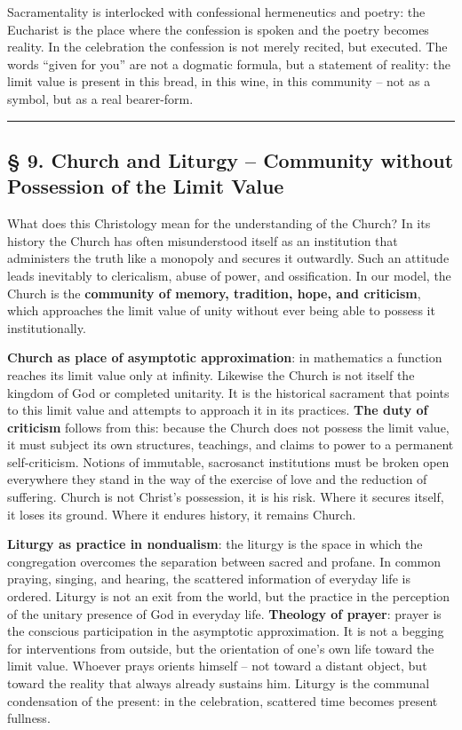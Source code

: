 \documentclass[
  english,
]{article}
\begin{document}
Sacramentality is interlocked with confessional hermeneutics and poetry:
the Eucharist is the place where the confession is spoken and the poetry
becomes reality. In the celebration the confession is not merely
recited, but executed. The words ``given for you'' are not a dogmatic
formula, but a statement of reality: the limit value is present in this
bread, in this wine, in this community -- not as a symbol, but as a real
bearer-form.

\begin{center}\rule{0.5\linewidth}{0.5pt}\end{center}

\subsection{§ 9. Church and Liturgy -- Community without Possession of
the Limit
Value}\label{church-and-liturgy-community-without-possession-of-the-limit-value}

What does this Christology mean for the understanding of the Church? In
its history the Church has often misunderstood itself as an institution
that administers the truth like a monopoly and secures it outwardly.
Such an attitude leads inevitably to clericalism, abuse of power, and
ossification. In our model, the Church is the \textbf{community of
memory, tradition, hope, and criticism}, which approaches the limit
value of unity without ever being able to possess it institutionally.

\textbf{Church as place of asymptotic approximation}: in mathematics a
function reaches its limit value only at infinity. Likewise the Church
is not itself the kingdom of God or completed unitarity. It is the
historical sacrament that points to this limit value and attempts to
approach it in its practices. \textbf{The duty of criticism} follows
from this: because the Church does not possess the limit value, it must
subject its own structures, teachings, and claims to power to a
permanent self-criticism. Notions of immutable, sacrosanct institutions
must be broken open everywhere they stand in the way of the exercise of
love and the reduction of suffering. Church is not Christ's possession,
it is his risk. Where it secures itself, it loses its ground. Where it
endures history, it remains Church.

\textbf{Liturgy as practice in nondualism}: the liturgy is the space in
which the congregation overcomes the separation between sacred and
profane. In common praying, singing, and hearing, the scattered
information of everyday life is ordered. Liturgy is not an exit from the
world, but the practice in the perception of the unitary presence of God
in everyday life. \textbf{Theology of prayer}: prayer is the conscious
participation in the asymptotic approximation. It is not a begging for
interventions from outside, but the orientation of one's own life toward
the limit value. Whoever prays orients himself -- not toward a distant
object, but toward the reality that always already sustains him. Liturgy
is the communal condensation of the present: in the celebration,
scattered time becomes present fullness.
\end{document}
